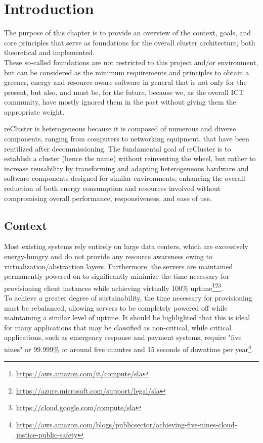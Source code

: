 \chapter{Introduction}
\label{cha:introduction}

The purpose of this chapter is to provide an overview of the context, goals, and
core principles that serve as foundations for the overall cluster architecture,
both theoretical and implemented. \\ %
These so-called foundations are not restricted to this project and/or
environment, but can be considered as the minimum requirements and principles to
obtain a greener, energy and resource-aware software in general that is not only
for the present, but also, and must be, for the future, because we, as the overall
ICT community, have mostly ignored them in the past without giving them the
appropriate weight.

reCluster is heterogeneous because it is composed of numerous and diverse
components, ranging from computers to networking equipment, that have been
reutilized after decommissioning. The fundamental goal of reCluster is to establish
a cluster (hence the name) without reinventing the wheel, but rather to increase
reusability by transforming and adapting heterogeneous hardware and software
components designed for similar environments, enhancing the overall reduction of
both energy consumption and resources involved without compromising overall performance,
responsiveness, and ease of use.

\section{Context}
\label{sec:introduction_context}

Most existing systems rely entirely on large data centers, which are excessively
energy-hungry and do not provide any resource awareness owing to virtualization/abstraction
layers. Furthermore, the servers are maintained permanently powered on to significantly
minimize the time necessary for provisioning client instances while achieving virtually
100\% uptime\footnote{\url{https://aws.amazon.com/it/compute/sla}}\footnote{\url{https://azure.microsoft.com/support/legal/sla}}\footnote{\url{https://cloud.google.com/compute/sla}}.
\\ %
To achieve a greater degree of sustainability, the time necessary for provisioning
must be rebalanced, allowing servers to be completely powered off while
maintaining a similar level of uptime. It should be highlighted that this is ideal
for many applications that may be classified as non-critical, while critical
applications, such as emergency response and payment systems, require "five nines"
or 99.999\% or around five minutes and 15 seconds of downtime per year\footnote{\url{https://aws.amazon.com/blogs/publicsector/achieving-five-nines-cloud-justice-public-safety}}.

